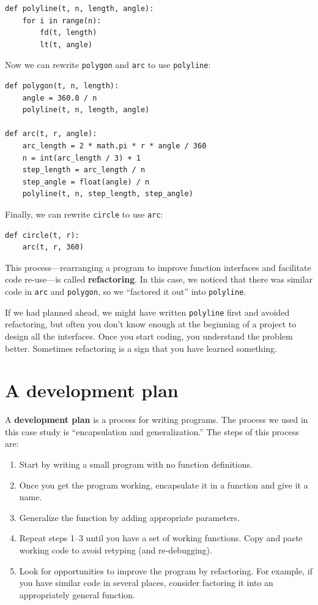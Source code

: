 \documentclass[10pt]{book}
\begin{document}
\begin{verbatim}
def polyline(t, n, length, angle):
    for i in range(n):
        fd(t, length)
        lt(t, angle)
\end{verbatim}
%
Now we can rewrite {\tt polygon} and {\tt arc} to use {\tt polyline}:

\begin{verbatim}
def polygon(t, n, length):
    angle = 360.0 / n
    polyline(t, n, length, angle)

def arc(t, r, angle):
    arc_length = 2 * math.pi * r * angle / 360
    n = int(arc_length / 3) + 1
    step_length = arc_length / n
    step_angle = float(angle) / n
    polyline(t, n, step_length, step_angle)
\end{verbatim}
%
Finally, we can rewrite {\tt circle} to use {\tt arc}:

\begin{verbatim}
def circle(t, r):
    arc(t, r, 360)
\end{verbatim}
%
This process---rearranging a program to improve function
interfaces and facilitate code re-use---is called {\bf refactoring}.
In this case, we noticed that there was similar code in {\tt arc} and
{\tt polygon}, so we ``factored it out'' into {\tt polyline}.

If we had planned ahead, we might have written {\tt polyline} first
and avoided refactoring, but often you don't know enough at the
beginning of a project to design all the interfaces.  Once you start
coding, you understand the problem better.  Sometimes refactoring is a
sign that you have learned something.


\section{A development plan}

A {\bf development plan} is a process for writing programs.
The process we used
in this case study is ``encapsulation and
generalization.''  The steps of this process are:

\begin{enumerate}

\item Start by writing a small program with no function definitions.

\item Once you get the program working, encapsulate it in a function
and give it a name.

\item Generalize the function by adding appropriate parameters.

\item Repeat steps 1--3 until you have a set of working functions.
Copy and paste working code to avoid retyping (and re-debugging).

\item Look for opportunities to improve the program by refactoring.
For example, if you have similar code in several places, consider
factoring it into an appropriately general function.

\end{enumerate}
\end{document}
